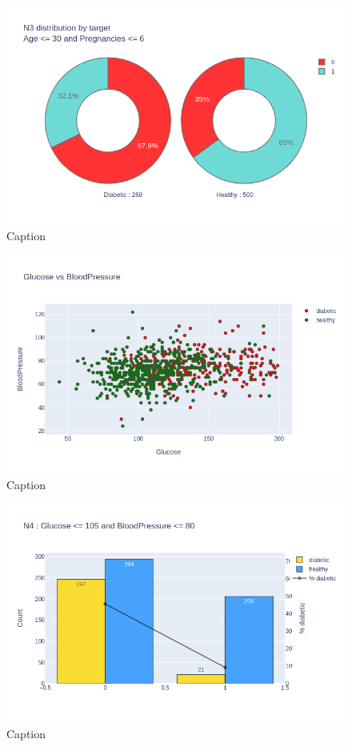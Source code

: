 \documentclass[12pt]{article}
\begin{document}
\begin{figure}[ht]
\centering
\includegraphics[width=1\textwidth]{newplot(19).png}
\caption{\label{fig:29} Caption}
\end{figure}

\begin{figure}[ht]
\centering
\includegraphics[width=1\textwidth]{newplot(20).png}
\caption{\label{fig:30} Caption}
\end{figure}

\begin{figure}[ht]
\centering
\includegraphics[width=1\textwidth]{newplot(21).png}
\caption{\label{fig:31} Caption}
\end{figure}
\end{document}
